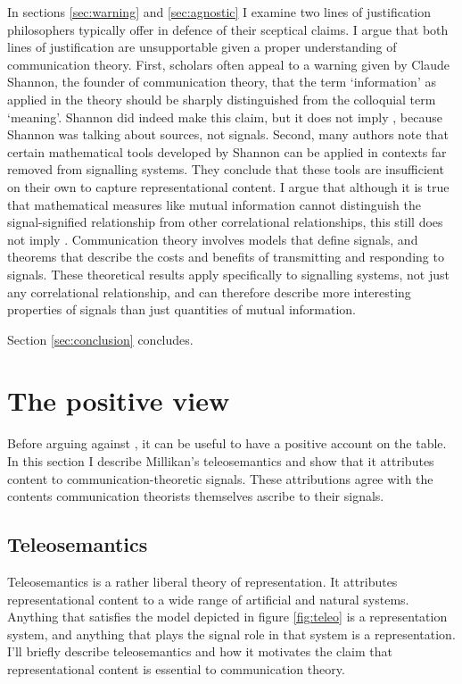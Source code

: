 \documentclass[12pt]{article}
\begin{document}
In sections \ref{sec:warning} and \ref{sec:agnostic} I examine two lines of justification philosophers typically offer in defence of their sceptical claims.
I argue that both lines of justification are unsupportable given a proper understanding of communication theory.
First, scholars often appeal to a warning given by Claude Shannon, the founder of communication theory, that the term `information' as applied in the theory should be sharply distinguished from the colloquial term `meaning'.
Shannon did indeed make this claim, but it does not imply \tic{}, because Shannon was talking about sources, not signals.
Second, many authors note that certain mathematical tools developed by Shannon can be applied in contexts far removed from signalling systems.
They conclude that these tools are insufficient on their own to capture representational content.
I argue that although it is true that mathematical measures like mutual information cannot distinguish the signal-signified relationship from other correlational relationships, this still does not imply \tic{}. 
Communication theory involves models that define signals, and theorems that describe the costs and benefits of transmitting and responding to signals.
These theoretical results apply specifically to signalling systems, not just any correlational relationship, and can therefore describe more interesting properties of signals than just quantities of mutual information.

Section \ref{sec:conclusion} concludes.

\section{The positive view}\label{sec:positive}

Before arguing against \tic{}, it can be useful to have a positive account on the table.
In this section I describe Millikan's teleosemantics and show that it attributes content to communication-theoretic signals.
These attributions agree with the contents communication theorists themselves ascribe to their signals.

\subsection{Teleosemantics}
Teleosemantics is a rather liberal theory of representation.
It attributes representational content to a wide range of artificial and natural systems.
Anything that satisfies the model depicted in figure \ref{fig:teleo} is a representation system, and anything that plays the signal role in that system is a representation.
I'll briefly describe teleosemantics and how it motivates the claim that representational content is essential to communication theory.
\end{document}
